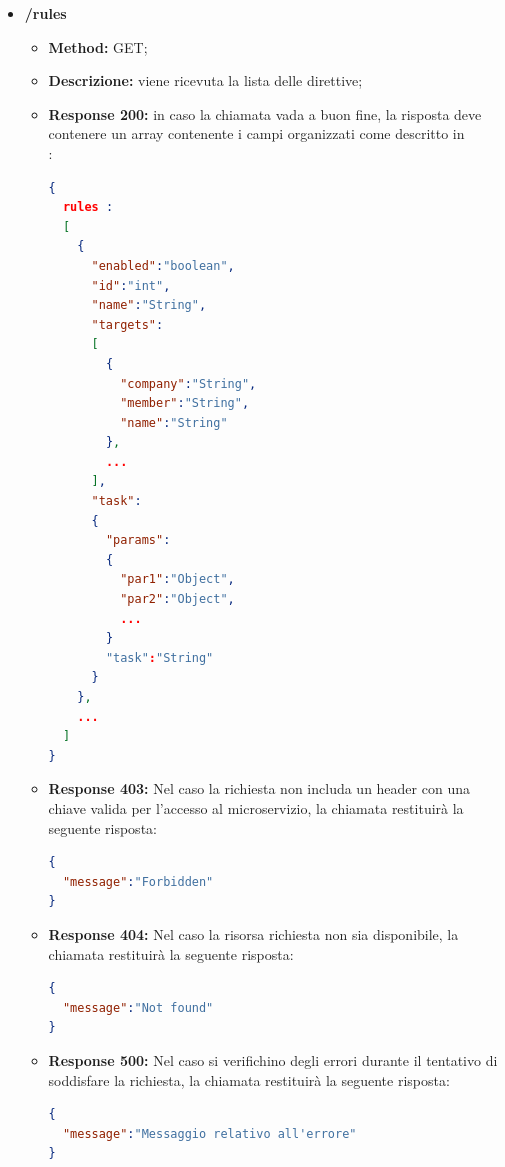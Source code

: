 \begin{itemize}

\item \textbf{/rules}\\

\begin{itemize}
\item \textbf{Method:} GET;
\item \textbf{Descrizione:} viene ricevuta la lista delle direttive;
\item \textbf{Response 200:} in caso la chiamata vada a buon fine, la risposta deve contenere un array contenente i campi organizzati come descritto in \\:
\begin{lstlisting}[language=json,firstnumber=1]
{
  rules :
  [
    {
      "enabled":"boolean",
      "id":"int",
      "name":"String",
      "targets":
      [
        {
          "company":"String",
          "member":"String",
          "name":"String"
        },
        ...
      ],
      "task":
      {
        "params":
        {
          "par1":"Object",
          "par2":"Object",
          ...
        }
        "task":"String"
      }
    },
    ...
  ]
}
\end{lstlisting}
\item \textbf{Response 403:} Nel caso la richiesta non includa un header  con una chiave valida per l'accesso al microservizio, la chiamata restituirà la seguente risposta:
\begin{lstlisting}[language=json,firstnumber=1]
{
  "message":"Forbidden"
}
\end{lstlisting}
\item \textbf{Response 404:} Nel caso la risorsa richiesta non sia disponibile, la chiamata restituirà la seguente risposta:
\begin{lstlisting}[language=json,firstnumber=1]
{
  "message":"Not found"
}
\end{lstlisting}
\item \textbf{Response 500:} Nel caso si verifichino degli errori durante il tentativo di soddisfare la richiesta, la chiamata restituirà la seguente risposta:
\begin{lstlisting}[language=json,firstnumber=1]
{
  "message":"Messaggio relativo all'errore"
}
\end{lstlisting}
\end{itemize}


\end{itemize}

